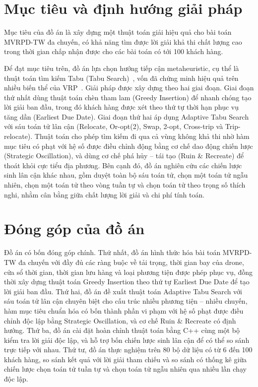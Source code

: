 \documentclass[../DoAn.tex]{subfiles}
\begin{document}
\section{Mục tiêu và định hướng giải pháp}

Mục tiêu của đồ án là xây dựng một thuật toán giải hiệu quả cho bài toán MVRPD-TW đa chuyến, có khả năng tìm được lời giải khả thi chất lượng cao trong thời gian chấp nhận được cho các bài toán có tới 100 khách hàng.

Để đạt mục tiêu trên, đồ án lựa chọn hướng tiếp cận metaheuristic, cụ thể là thuật toán tìm kiếm Tabu (Tabu Search)~\cite{glover1986future, glover1997tabu}, vốn đã chứng minh hiệu quả trên nhiều biến thể của VRP~\cite{gendreau1994tabu, cordeau2001unified}. Giải pháp được xây dựng theo hai giai đoạn. Giai đoạn thứ nhất dùng thuật toán chèn tham lam (Greedy Insertion) để nhanh chóng tạo lời giải ban đầu, trong đó khách hàng được xét theo thứ tự thời hạn phục vụ tăng dần (Earliest Due Date). Giai đoạn thứ hai áp dụng Adaptive Tabu Search với sáu toán tử lân cận (Relocate, Or-opt(2), Swap, 2-opt, Cross-trip và Trip-relocate). Thuật toán cho phép tìm kiếm đi qua cả vùng không khả thi nhờ hàm mục tiêu có phạt với hệ số được điều chỉnh động bằng cơ chế dao động chiến lược (Strategic Oscillation), và dùng cơ chế phá hủy -- tái tạo (Ruin \& Recreate) để thoát khỏi cực tiểu địa phương. Bên cạnh đó, đồ án nghiên cứu các chiến lược sinh lân cận khác nhau, gồm duyệt toàn bộ sáu toán tử, chọn một toán tử ngẫu nhiên, chọn một toán tử theo vòng tuần tự và chọn toán tử theo trọng số thích nghi, nhằm cân bằng giữa chất lượng lời giải và chi phí tính toán.

\section{Đóng góp của đồ án}

Đồ án có bốn đóng góp chính. Thứ nhất, đồ án hình thức hóa bài toán MVRPD-TW đa chuyến với đầy đủ các ràng buộc về tải trọng, thời gian bay của drone, cửa sổ thời gian, thời gian lưu hàng và loại phương tiện được phép phục vụ, đồng thời xây dựng thuật toán Greedy Insertion theo thứ tự Earliest Due Date để tạo lời giải ban đầu. Thứ hai, đồ án đề xuất thuật toán Adaptive Tabu Search với sáu toán tử lân cận chuyên biệt cho cấu trúc nhiều phương tiện -- nhiều chuyến, hàm mục tiêu chuẩn hóa có bốn thành phần vi phạm với hệ số phạt được điều chỉnh độc lập bằng Strategic Oscillation, và cơ chế Ruin \& Recreate có định hướng. Thứ ba, đồ án cài đặt hoàn chỉnh thuật toán bằng C++ cùng một bộ kiểm tra lời giải độc lập, và hỗ trợ bốn chiến lược sinh lân cận để có thể so sánh trực tiếp với nhau. Thứ tư, đồ án thực nghiệm trên 80 bộ dữ liệu có từ 6 đến 100 khách hàng, so sánh kết quả với lời giải tham chiếu và so sánh có thống kê giữa chiến lược chọn toán tử tuần tự và chọn toán tử ngẫu nhiên qua nhiều lần chạy độc lập.
\end{document}
